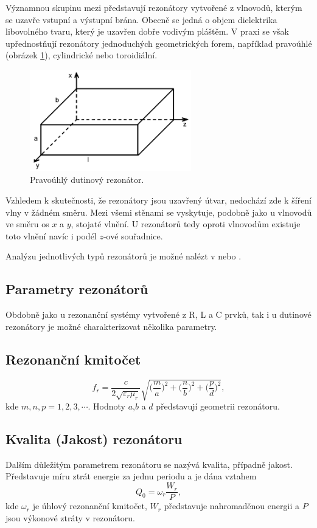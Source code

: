 Významnou skupinu mezi představují rezonátory vytvořené z vlnovodů, kterým se uzavře vstupní a výstupní brána. Obecně se jedná o objem dielektrika libovolného tvaru, který je uzavřen dobře vodivým pláštěm. V praxi se však upřednostňují rezonátory jednoduchých geometrických forem, například pravoúhlé (obrázek \ref{obr:evlny_rezonator}), cylindrické nebo toroidiální. 
\begin{figure}[!h]
	\centering
	\includegraphics[width=7cm]{evlny_rezonator.png}
	\caption{Pravoúhlý dutinový rezonátor.}
	\label{obr:evlny_rezonator}
\end{figure}

Vzhledem k skutečnosti, že rezonátory jsou uzavřený útvar, nedochází zde k šíření vlny v žádném směru. Mezi všemi stěnami se vyskytuje, podobně jako u vlnovodů ve směru os $x$ a $y$, stojaté vlnění. U rezonátorů tedy oproti vlnovodům existuje toto vlnění navíc i podél $z$-ové souřadnice. 

Analýzu jednotlivých typů rezonátorů je možné nalézt v \cite{emp} nebo \cite{tripak}.

\subsection{Parametry rezonátorů}
Obdobně jako u rezonanční systémy vytvořené z R, L a C prvků, tak i u dutinové rezonátory je možné charakterizovat několika parametry.
\subsection*{Rezonanční kmitočet}
\begin{displaymath}
	f_r = \frac{c}{2\sqrt{\varepsilon_r \mu_r}}\sqrt{\bigg(\frac{m}{a}\bigg)^{2} + \bigg(\frac{n}{b}\bigg)^{2} + \bigg(\frac{p}{d}\bigg)^{2}},
\end{displaymath}
kde $m, n, p = 1, 2, 3,\cdots$. Hodnoty $a$,$b$ a $d$ představují geometrii rezonátoru.
\subsection*{Kvalita (Jakost) rezonátoru}
Dalším důležitým parametrem rezonátoru se nazývá kvalita, případně jakost. Představuje míru ztrát energie za jednu periodu a je dána vztahem
\begin{displaymath}
	Q_0 = \omega_r \frac{W_{r}}{P},
\end{displaymath}
kde $\omega_r$ je úhlový rezonanční kmitočet, $W_r$ představuje nahromaděnou  energii a $P$ jsou výkonové ztráty v rezonátoru.
\newpage